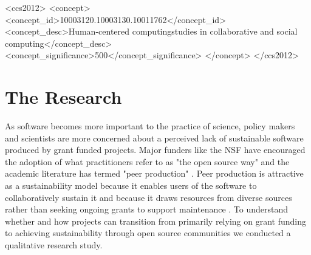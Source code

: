 \documentclass[sigchi-a,screen]{acmart}
\begin{document}
\begin{CCSXML}
<ccs2012>
<concept>
<concept_id>10003120.10003130.10011762</concept_id>
<concept_desc>Human-centered computing\textasciitildeEmpirical studies in collaborative and social computing</concept_desc>
<concept_significance>500</concept_significance>
</concept>
</ccs2012>
\end{CCSXML}




\maketitle


\section{The Research}

As software becomes more important to the practice of science, policy makers and scientists are more concerned about a perceived lack of sustainable software produced by grant funded projects. Major funders like the NSF have encouraged the adoption of what practitioners refer to as "the open source way" \cite{howison_collaboration_2014} \cite{red_hat_community_architecture_open_2009} and the academic literature has termed "peer production" \cite{benkler_coases_2002} \cite{von_hippel_open_2003}. Peer production is attractive as a sustainability model because it enables users of the software to collaboratively sustain it and because it draws resources from diverse sources rather than seeking ongoing grants to support maintenance \cite{gambardella_proprietary_2005} \cite{katz_report_2016}. To understand whether and how projects can transition from primarily relying on grant funding to achieving sustainability through open source communities we conducted a qualitative research study.
\end{document}
